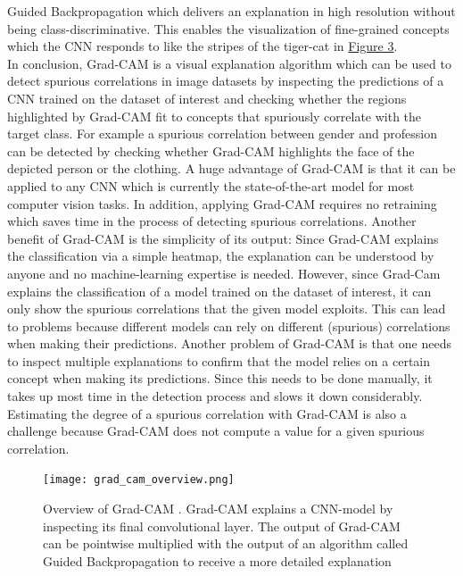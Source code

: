 \documentclass{article}
\begin{document}
Guided Backpropagation which delivers an explanation in high resolution without being class-discriminative.
This enables the visualization of fine-grained concepts which the CNN responds to like
the stripes of the tiger-cat in \hyperref[fig:gradcam]{Figure 3}. \\
In conclusion, Grad-CAM is a visual explanation algorithm which can be used to detect spurious correlations
in image datasets by inspecting the predictions of a CNN trained on the dataset of interest and checking whether the regions
highlighted by Grad-CAM fit to concepts that spuriously correlate with the target class.
For example a spurious correlation between gender and profession can be detected by checking whether Grad-CAM
highlights the face of the depicted person or the clothing. 
A huge advantage of Grad-CAM is that it can be applied to any CNN which is currently the state-of-the-art model
for most computer vision tasks. In addition, applying Grad-CAM requires no retraining which saves time in the process
of detecting spurious correlations. Another benefit of Grad-CAM is the simplicity of its output:
Since Grad-CAM explains the classification via a  simple heatmap, the explanation can be understood by anyone
and no machine-learning expertise is needed. 
However, since Grad-Cam explains the classification of a model trained on the dataset of interest,
it can only show the spurious correlations that the given model exploits. This can lead to problems because
different models can rely on different (spurious) correlations when making their predictions.
Another problem of Grad-CAM is that one needs to inspect multiple explanations to confirm that the model
relies on a certain concept when making its predictions. Since this needs to be done manually, it takes up
most time in the detection process and slows it down considerably. Estimating the degree of a spurious correlation
with Grad-CAM is also a challenge because Grad-CAM does not compute a value for a given spurious correlation.


\begin{figure}
    \centering
    \texttt{[image: grad\_cam\_overview.png]}
    \caption{Overview of Grad-CAM \cite{Selvaraju_2017_ICCV}. Grad-CAM explains
    a CNN-model by inspecting its final convolutional layer. The output of Grad-CAM can be pointwise multiplied
    with the output of an algorithm called Guided Backpropagation \cite{springenberg2015striving} to receive a
    more detailed explanation}
    \label{fig:gradcam}
\end{figure}
\end{document}
